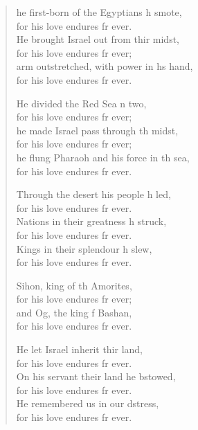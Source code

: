 \begin{verse}
  \begin{patverse}
he first-born of the Egyptians h smote,\Med\\
    for his love endures fr ever.\\
He brought Israel out from thir midst,\Med\\
    for his love endures fr ever;\\
arm outstretched, with power in h\pointup{\i}s hand,\Med\\
    for his love endures fr ever.

He divided the Red Sea \pointup{\i}n two,\Med\\
    for his love endures fr ever;\\
he made Israel pass through th midst,\Med\\
    for his love endures fr ever;\\
he flung Pharaoh and his force in th sea,\Med\\
    for his love endures fr ever.

Through the desert his people h led,\Med\\
    for his love endures fr ever.\\
Nations in their greatness h struck,\Med\\
    for his love endures fr ever.\\
Kings in their splendour h slew,\Med\\
    for his love endures fr ever.

Sihon, king of th Amorites,\Med\\
    for his love endures fr ever;\\
and Og, the king f Bashan,\Med\\
    for his love endures fr ever.

He let Israel inherit thir land,\Med\\
    for his love endures fr ever.\\
On his servant their land he bstowed,\Med\\
    for his love endures fr ever.\\
He remembered us in our d\pointup{\i}stress,\Med\\
    for his love endures fr ever.


\end{patverse}
\end{verse}
